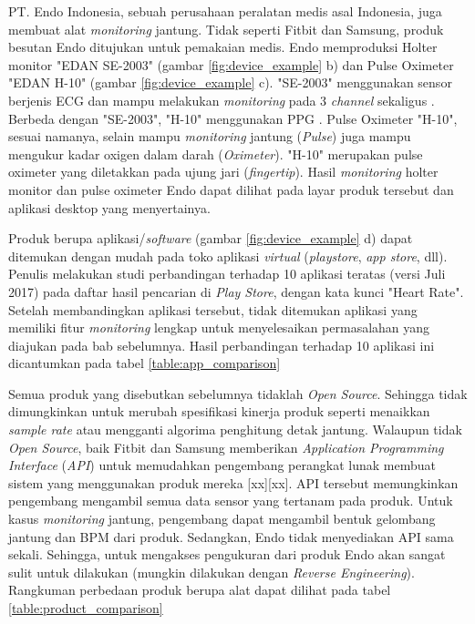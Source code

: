 PT. Endo Indonesia, sebuah perusahaan peralatan medis asal Indonesia, juga membuat alat \textit{monitoring} jantung. Tidak seperti Fitbit dan Samsung, produk besutan Endo ditujukan untuk pemakaian medis. Endo memproduksi Holter monitor "EDAN SE-2003" (gambar \ref{fig:device_example} b) dan Pulse Oximeter "EDAN H-10" (gambar \ref{fig:device_example} c). "SE-2003" menggunakan sensor berjenis ECG dan mampu melakukan \textit{monitoring} pada 3 \textit{channel} sekaligus \cite{endo_holter}. Berbeda dengan "SE-2003", "H-10" menggunakan PPG \cite{endo_oxi}. Pulse Oximeter "H-10", sesuai namanya, selain mampu \textit{monitoring} jantung (\textit{Pulse}) juga mampu mengukur kadar oxigen dalam darah (\textit{Oximeter}). "H-10" merupakan pulse oximeter yang diletakkan pada ujung jari (\textit{fingertip}). Hasil \textit{monitoring} holter monitor dan pulse oximeter Endo dapat dilihat pada layar produk tersebut dan aplikasi desktop yang menyertainya.

Produk berupa aplikasi/\textit{software} (gambar \ref{fig:device_example} d) dapat ditemukan dengan mudah pada toko aplikasi \textit{virtual} (\textit{playstore}, \textit{app store}, dll). Penulis melakukan studi perbandingan terhadap 10 aplikasi teratas (versi Juli 2017) pada daftar hasil pencarian di \textit{Play Store}, dengan kata kunci "Heart Rate". Setelah membandingkan aplikasi tersebut, tidak ditemukan aplikasi yang memiliki fitur \textit{monitoring} lengkap untuk menyelesaikan permasalahan yang diajukan pada bab sebelumnya. Hasil perbandingan terhadap 10 aplikasi ini dicantumkan pada tabel \ref{table:app_comparison}

Semua produk yang disebutkan sebelumnya tidaklah \textit{Open Source}. Sehingga tidak dimungkinkan untuk merubah spesifikasi kinerja produk seperti menaikkan \textit{sample rate} atau mengganti algorima penghitung detak jantung. Walaupun tidak \textit{Open Source}, baik Fitbit dan Samsung memberikan \textit{Application Programming Interface} (\textit{API}) untuk memudahkan pengembang perangkat lunak membuat sistem yang menggunakan produk mereka [xx][xx]. API tersebut memungkinkan pengembang mengambil semua data sensor yang tertanam pada produk. Untuk kasus \textit{monitoring} jantung, pengembang dapat mengambil bentuk gelombang jantung dan BPM dari produk. Sedangkan, Endo tidak menyediakan API sama sekali. Sehingga, untuk mengakses pengukuran dari produk Endo akan sangat sulit untuk dilakukan (mungkin dilakukan dengan \textit{Reverse Engineering}). Rangkuman perbedaan produk berupa alat dapat dilihat pada tabel \ref{table:product_comparison}

